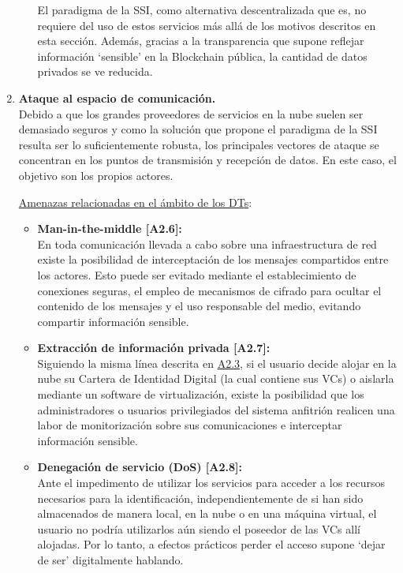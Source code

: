 \documentclass[../main.tex]{subfiles}
\begin{document}
\begin{enumerate}[label=\textbf{R2.\arabic*}, leftmargin=48pt]
\begin{itemize}
        El paradigma de la \acrshort{SSI}, como alternativa descentralizada que es, no requiere del uso de estos servicios más allá de los motivos descritos en esta sección. Además, gracias a la transparencia que supone reflejar información `sensible' en la Blockchain pública, la cantidad de datos privados se ve reducida.
        \\
    \end{itemize}
    
    \item \textbf{Ataque al espacio de comunicación.}\label{R2.2}
    \\ Debido a que los grandes proveedores de servicios en la nube suelen ser demasiado seguros y como la solución que propone el paradigma de la  \acrshort{SSI} resulta ser lo suficientemente robusta, los principales vectores de ataque se concentran en los puntos de transmisión y recepción de datos. En este caso, el objetivo son los propios actores.
    
    \underline{Amenazas relacionadas en el ámbito de los \acrshort{DT}s}:
    \begin{itemize}
        \item \textbf{Man-in-the-middle [A2.6]:}\label{A2.6}
        \\ En toda comunicación llevada a cabo sobre una infraestructura de red existe la posibilidad de interceptación de los mensajes compartidos entre los actores. Esto puede ser evitado mediante el establecimiento de conexiones seguras, el empleo de mecanismos de cifrado para ocultar el contenido de los mensajes y el uso responsable del medio, evitando compartir información sensible.
        \item \textbf{Extracción de información privada [A2.7]:}\label{A2.7}
        \\ Siguiendo la misma línea descrita en \hyperref[A2.3]{A2.3}, si el usuario decide alojar en la nube su Cartera de Identidad Digital (la cual contiene sus \acrshort{VC}s) o aislarla mediante un software de virtualización, existe la posibilidad que los administradores o usuarios privilegiados del sistema anfitrión realicen una labor de monitorización sobre sus comunicaciones e interceptar información sensible.
        \item \textbf{Denegación de servicio (DoS) [A2.8]:}\label{A2.8}
        \\ Ante el impedimento de utilizar los servicios para acceder a los recursos necesarios para la identificación, independientemente de si han sido almacenados de manera local, en la nube o en una máquina virtual, el usuario no podría utilizarlos aún siendo el poseedor de las \acrshort{VC}s allí alojadas. Por lo tanto, a efectos prácticos perder el acceso supone `dejar de ser' digitalmente hablando. 
    \end{itemize}
    

\end{enumerate}
\end{document}
